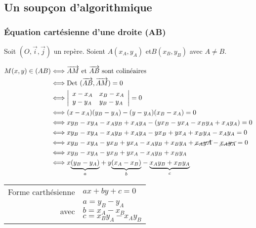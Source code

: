 \samepage

\newpage
\vspace{-1cm}
\subsection{Un soupçon d'algorithmique}
\subsubsection{Équation cartésienne d'une droite (AB)}

Soit $(O, \vec{i}, \vec{j})$ un repère.
\smallskip
Soient $A(x_A, y_A)$  et$  B(x_B, y_B)$ avec $ A \neq B $.     

\vspace*{-.2cm}

\begin{minipage}[t]{6cm}
\begin{equation*}  \begin{aligned}
M(x,y) \in (AB)  &\Longleftrightarrow \overrightarrow{AM} \textrm{ et } \overrightarrow{AB} \textrm{ sont colinéaires} \\
   & \Longleftrightarrow\textrm{Det } (\overrightarrow{AB},\overrightarrow{AM}) = 0 \\
   & \Longleftrightarrow \left|\begin{array}{ll}
x-x_A & x_B-x_A\\
y-y_A & y_B-y_A
\end{array}\right| = 0 \\
    & \Longleftrightarrow (x-x_A) (y_B-y_A)- (y-y_A)(x_B-x_A) = 0 \\
    & \Longleftrightarrow xy_B-xy_A -x_Ay_B+x_Ay_A - (yx_B-yx_A-x_By_A+x_Ay_A)= 0 \\
    & \Longleftrightarrow xy_B-xy_A-x_Ay_B+x_Ay_A-yx_B+yx_A+x_By_A-x_Ay_A= 0 \\
    & \Longleftrightarrow xy_B-xy_A-yx_B+yx_A-x_Ay_B+x_By_A 
                         +\cancel{x_AyA}-\cancel{x_Ay_A}= 0 \\
   & \Longleftrightarrow xy_B-xy_A-yx_B+yx_A-x_Ay_B+x_By_A \\  
   & \Longleftrightarrow x\underset{a}{\underbrace{(y_B-y_A)}} +y \underset{b}{\underbrace{(x_A -x_B)}}    -\underset{c}{\underbrace{x_Ay_B+x_By_A}} \\
 \end{aligned}  \end{equation*}
 
\begin{tabular}{rl}
 Forme carthésienne & $ax+by+c=0$ \\
  avec & \parbox[t]{3cm}{ $a=y_B - y_A$\\
                       $b=x_A - x_B $ \\
                       $c=x_By_A - x_Ay_B$\\                        
          } \\
\end{tabular}
 

\end{minipage}

